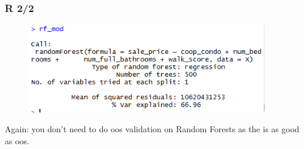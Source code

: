 \documentclass[handout]{beamer}
\begin{document}
\begin{frame}\frametitle{R 2/2}

\begin{figure}
\centering
\includegraphics[width=4.1in]{R01.png}
\end{figure}

Again: you don't need to do oos validation on Random Forests as the  is as good as oos.
\end{frame}
\end{document}
